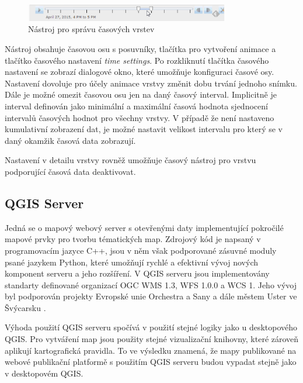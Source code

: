 \begin{figure}[h!]  \centering
\includegraphics[width=0.8\textwidth]{../img/arcgis-online-time-slider.png}
	\caption{Nástroj pro správu časových vrstev}
	\label{fig:arcgis-time-settings}
\end{figure}

Nástroj obsahuje časovou osu s posuvníky, tlačítka
pro vytvoření animace a tlačítko časového nastavení \textit{time
settings}. Po rozkliknutí tlačítka časového nastavení se zobrazí
dialogové okno, které umožňuje konfiguraci časové osy. Nastavení
dovoluje pro účely animace vrstvy změnit dobu trvání jednoho
snímku. Dále je možné omezit časovou osu jen na daný časový
interval. Implicitně je interval definován jako minimální a maximální
časová hodnota sjednocení intervalů časových hodnot pro všechny
vrstvy. V případě že není nastaveno kumulativní zobrazení dat, je
možné nastavit velikost intervalu pro který se v daný okamžik časová
data zobrazují.

Nastavení v detailu vrstvy rovněž umožňuje časový nástroj pro vrstvu
podporující časová data deaktivovat.

\newpage
\subsection{QGIS Server}

Jedná se o mapový webový server s otevřenými daty implementující
pokročilé mapové prvky pro tvorbu tématických map. Zdrojový kód je
napsaný v programovacím jazyce C++, jsou v něm však podporované
zásuvné moduly psané jazykem Python, které umožňují rychlé a efektivní
vývoj nových komponent serveru a jeho rozšíření. V QGIS serveru jsou
implementovány standarty definované organizací OGC WMS 1.3, WFS 1.0.0
a WCS 1. Jeho vývoj byl podporován projekty Evropské unie Orchestra a
Sany a dále městem Uster ve Švýcarsku \cite{qgis-server}.

Výhoda použití QGIS serveru spočívá v použití stejné logiky jako u
desktopového QGIS. Pro vytváření map jsou použity stejné vizualizační
knihovny, které zároveň aplikují kartografická pravidla. To ve
výsledku znamená, že mapy publikované na webové publikační platformě s
použitím QGIS serveru budou vypadat stejně jako v desktopovém QGIS.

